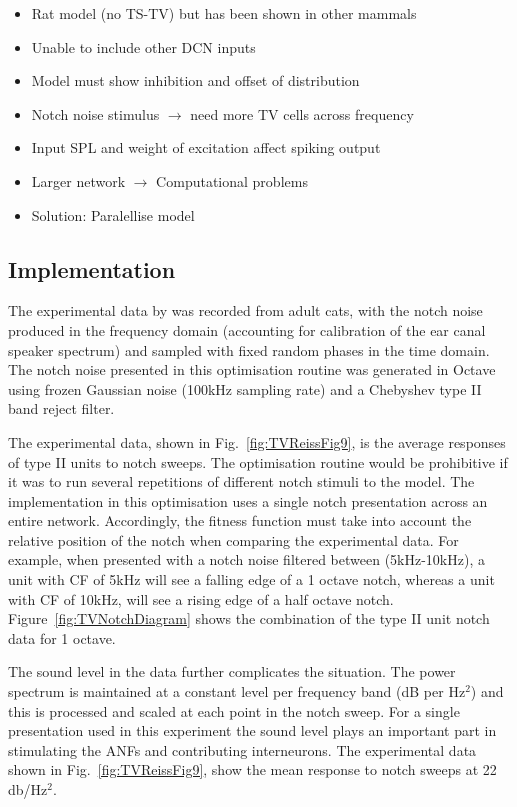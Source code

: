 \begin{itemize}
\item Rat model (no TS-TV) but has been shown in other mammals
\item Unable to include other DCN inputs
\item Model must show \DSTV inhibition and offset of distribution


\item Notch noise stimulus $\rightarrow$ need more TV cells across
  frequency
\item Input SPL and weight of excitation affect spiking output
\item Larger network $\rightarrow$ Computational problems
\item Solution: Paralellise model
\end{itemize}


\subsection{Implementation}

The experimental data by \citet{ReissYoung:2005} was recorded from adult cats,
with the notch noise produced in the frequency domain (accounting for
calibration of the ear canal speaker spectrum) and sampled with fixed random
phases in the time domain. The notch noise presented in this optimisation
routine was generated in Octave using frozen Gaussian noise (100kHz sampling
rate) and a Chebyshev type II band reject filter.

The experimental data, shown in Fig.~\ref{fig:TVReissFig9}, is the average
responses of type II units to notch sweeps.  The optimisation routine would be
prohibitive if it was to run several repetitions of different notch stimuli to
the model. The implementation in this optimisation uses a single notch
presentation across an entire network. Accordingly, the fitness function must
take into account the relative position of the notch when comparing the
experimental data.  For example, when presented with a notch noise filtered
between (5kHz-10kHz), a unit with CF of 5kHz will see a falling edge of a 1
octave notch, whereas a unit with CF of 10kHz, will see a rising edge of a half
octave notch.  Figure~\ref{fig:TVNotchDiagram} shows the combination of the type
II unit notch data for 1 octave.

The sound level in the \citet{ReissYoung:2005} data further complicates the
situation.  The power spectrum is maintained at a constant level per frequency
band (dB per Hz$^2$) and this is processed and scaled at each point in the notch
sweep.  For a single presentation used in this experiment the sound level plays
an important part in stimulating the ANFs and contributing interneurons.  The
experimental data shown in Fig.~\ref{fig:TVReissFig9}, show the mean response to
notch sweeps at 22 db/Hz$^2$.

